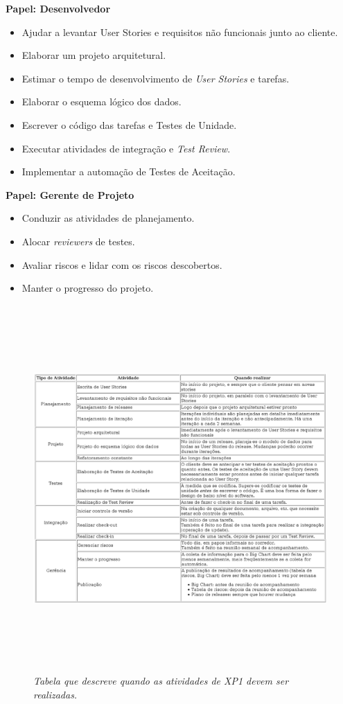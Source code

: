 \textbf{Papel: Desenvolvedor}
\begin{itemize}
 \item Ajudar a levantar User Stories e requisitos não funcionais junto ao cliente.
 \item Elaborar um projeto arquitetural.
 \item Estimar o tempo de desenvolvimento de \textit{User Stories} e tarefas.
 \item Elaborar o esquema lógico dos dados.
 \item Escrever o código das tarefas e Testes de Unidade.
 \item Executar atividades de integração e \textit{Test Review}.
 \item Implementar a automação de Testes de Aceitação.
\end{itemize}

\textbf{Papel: Gerente de Projeto}
\begin{itemize}
 \item Conduzir as atividades de planejamento.
 \item Alocar \textit{reviewers} de testes.
 \item Avaliar riscos e lidar com os riscos descobertos.
 \item Manter o progresso do projeto.
\end{itemize}

\begin{figure}[!h]
 \includegraphics[height = 14cm]{tab1.eps}
 \caption{\it Tabela que descreve quando as atividades de XP1 devem ser realizadas.} \label{tab:tab1}
\end{figure}

